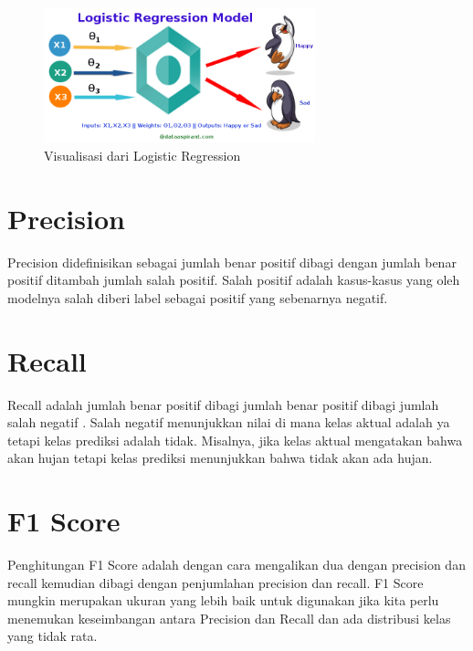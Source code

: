 \begin{figure}[!ht]
	\centering\includegraphics[width=0.7\textwidth]{bab2/figures/logistic.png}
	\caption{Visualisasi dari Logistic Regression}
	\label{fig:abstraksi1}
\end{figure}
\section{Precision}
\par Precision didefinisikan sebagai jumlah benar positif dibagi dengan jumlah benar positif ditambah jumlah salah positif. Salah positif adalah kasus-kasus yang oleh modelnya salah diberi label sebagai positif yang sebenarnya negatif\cite{precisionrecall}.

\section{Recall}
\par Recall adalah jumlah benar positif dibagi jumlah benar positif dibagi jumlah salah negatif \cite{precisionrecall}. Salah negatif menunjukkan nilai di mana kelas aktual adalah ya tetapi kelas prediksi adalah tidak. Misalnya, jika kelas aktual mengatakan bahwa akan hujan tetapi kelas prediksi menunjukkan bahwa tidak akan ada hujan.

\section{F1 Score}
\par Penghitungan F1 Score adalah dengan cara mengalikan dua dengan precision dan recall kemudian dibagi dengan penjumlahan precision dan recall. F1 Score mungkin merupakan ukuran yang lebih baik untuk digunakan jika kita perlu menemukan keseimbangan antara Precision dan Recall dan ada distribusi kelas yang tidak rata\cite{f1score_def}.
